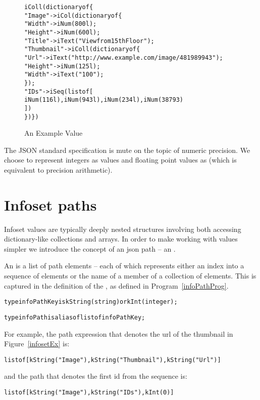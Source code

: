 \begin{figure}[hbt]
\begin{alltt}
iColl(dictionary of \{
  "Image" -> iCol(dictionary of \{
    "Width" -> iNum(800l);
    "Height" -> iNum(600l);
    "Title" -> iText("View from 15th Floor");
    "Thumbnail" -> iColl(dictionary of \{
      "Url" -> iText("http://www.example.com/image/481989943");
      "Height" -> iNum(125l);
      "Width" -> iText("100");
    \});
    "IDs" -> iSeq(list of [ 
      iNum(116l), iNum(943l), iNum(234l), iNum(38793)
    ])
  \})\})
\end{alltt}
\caption{An Example  Value}
\label{infosetEx}
\end{figure}

\begin{aside}
The JSON standard specification is mute on the topic of numeric precision. We choose to represent integers as  values and floating point values as  (which is equivalent to  precision arithmetic).
\end{aside}

\section{Infoset paths}
\label{infoPath}

Infoset values are typically deeply nested structures involving both accessing dictionary-like collections and arrays. In order to make working with  values simpler we introduce the concept of an json path -- an .

An  is a list of path elements -- each of which represents either an index into a sequence of  elements or the name of a member of a collection of elements. This is captured in the definition of the , as defined in Program~\vref{infoPathProg}.
\begin{program}
\begin{alltt}
type infoPathKey is kString(string) or kInt(integer);

type infoPath is alias of list of infoPathKey;
\end{alltt}
\caption{The  and  Types\label{infoPathProg}}
\end{program}

For example, the path expression that denotes the url of the thumbnail in Figure~\vref{infosetEx} is:
\begin{alltt}
list of [kString("Image"), kString("Thumbnail"), kString("Url")]
\end{alltt}
and the path that denotes the first id from the  sequence is:
\begin{alltt}
list of [kString("Image"), kString("IDs"), kInt(0)]
\end{alltt}


